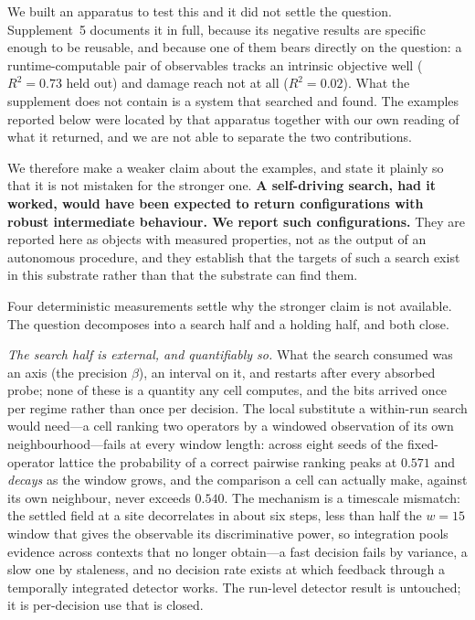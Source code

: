 We built an apparatus to test this and it did not settle the question.
Supplement~5 documents it in full, because its negative results are specific enough to
be reusable, and because one of them bears directly on the question: a runtime-computable
pair of observables tracks an intrinsic objective well ($R^2 = 0.73$ held out) and damage
reach not at all ($R^2 = 0.02$). What the supplement does not contain is a system that
searched and found. The examples reported below were located by that apparatus together
with our own reading of what it returned, and we are not able to separate the two
contributions.

We therefore make a weaker claim about the examples, and state it plainly so
that it is not mistaken for the stronger one. \textbf{A self-driving search,
had it worked, would have been expected to return configurations with robust
intermediate behaviour. We report such configurations.} They are reported here
as objects with measured properties, not as the output of an autonomous
procedure, and they establish that the targets of such a search exist in this
substrate rather than that the substrate can find them.

Four deterministic measurements settle why the stronger claim is not
available. The question decomposes into a search half and a holding half, and
both close.

\emph{The search half is external, and quantifiably so.} What the search
consumed was an axis (the precision $\beta$), an interval on it, and restarts
after every absorbed probe; none of these is a quantity any cell computes, and
the bits arrived once per regime rather than once per decision. The local
substitute a within-run search would need---a cell ranking two operators by a
windowed observation of its own neighbourhood---fails at every window length:
across eight seeds of the fixed-operator lattice the probability of a correct
pairwise ranking peaks at $0.571$ and \emph{decays} as the window grows, and
the comparison a cell can actually make, against its own neighbour, never
exceeds $0.540$. The mechanism is a timescale mismatch: the settled field at a
site decorrelates in about six steps, less than half the $w = 15$ window that
gives the observable its discriminative power, so integration pools evidence
across contexts that no longer obtain---a fast decision fails by variance, a
slow one by staleness, and no decision rate exists at which feedback through a
temporally integrated detector works. The run-level detector result is
untouched; it is per-decision use that is closed.


